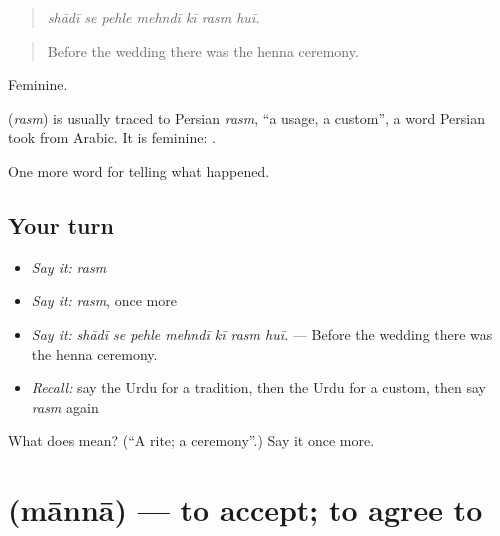 \begin{quote}
      
\end{quote}

\begin{quote}
\emph{shādī se pehle mehndī kī rasm huī.}
\end{quote}

\begin{quote}
Before the wedding there was the henna ceremony.
\end{quote}

Feminine.

\begin{cousinweb}
\textbf{} (\emph{rasm}) is usually traced to Persian \emph{rasm}, \textquotedblleft{}a usage, a custom\textquotedblright{}, a word Persian took from Arabic. It is feminine: \textbf{ }.
\end{cousinweb}

\begin{grammarlens}[title={What you've built}]
One more word for telling what happened.
\end{grammarlens}

\subsection*{Your turn}
\begin{itemize}
\raggedright
  \item \emph{Say it:} \emph{rasm}
  \item \emph{Say it:} \emph{rasm}, once more
  \item \emph{Say it:} \emph{shādī se pehle mehndī kī rasm huī.} — Before the wedding there was the henna ceremony.
  \item \emph{Recall:} say the Urdu for a tradition, then the Urdu for a custom, then say \emph{rasm} again
\end{itemize}

\begin{tcolorbox}[breakable,colback=teal!4,colframe=teal!35!black,title={Before you move on}]
What does  mean? (\textquotedblleft{}A rite; a ceremony\textquotedblright{}.) Say it once more.
\end{tcolorbox}
\section[\texorpdfstring{\ur{ماننا} (mānnā)}{ماننا (mānnā)}]{ (mānnā) — to accept; to agree to}

